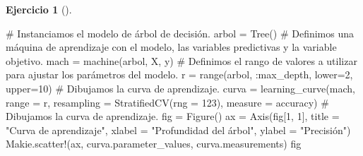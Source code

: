 \documentclass[
  a4paper,
]{scrreport}
\newenvironment{Shaded}{\begin{snugshade}}{\end{snugshade}}
\newcommand{\CommentTok}[1]{\textcolor[rgb]{0.37,0.37,0.37}{#1}}
\newcommand{\FloatTok}[1]{\textcolor[rgb]{0.68,0.00,0.00}{#1}}
\newcommand{\FunctionTok}[1]{\textcolor[rgb]{0.28,0.35,0.67}{#1}}
\newcommand{\NormalTok}[1]{\textcolor[rgb]{0.00,0.23,0.31}{#1}}
\newcommand{\OperatorTok}[1]{\textcolor[rgb]{0.37,0.37,0.37}{#1}}
\newcommand{\StringTok}[1]{\textcolor[rgb]{0.13,0.47,0.30}{#1}}
\theoremstyle{definition}
\newtheorem{exercise}{Ejercicio}[chapter]
\theoremstyle{remark}
\begin{document}
\begin{exercise}[]
\begin{enumerate}
  \begin{tcolorbox}[enhanced jigsaw, toptitle=1mm, breakable, toprule=.15mm, opacitybacktitle=0.6, coltitle=black, titlerule=0mm, arc=.35mm, title=\textcolor{quarto-callout-tip-color}{\faLightbulb}\hspace{0.5em}{Solución}, rightrule=.15mm, opacityback=0, colback=white, bottomrule=.15mm, leftrule=.75mm, colbacktitle=quarto-callout-tip-color!10!white, bottomtitle=1mm, colframe=quarto-callout-tip-color-frame, left=2mm]

\begin{Shaded}
\begin{Highlighting}[]
\CommentTok{\# Instanciamos el modelo de árbol de decisión.}
\NormalTok{arbol }\OperatorTok{=} \FunctionTok{Tree}\NormalTok{()}
\CommentTok{\# Definimos una máquina de aprendizaje con el modelo, las variables predictivas y la variable objetivo.}
\NormalTok{mach }\OperatorTok{=} \FunctionTok{machine}\NormalTok{(arbol, X, y)}
\CommentTok{\# Definimos el rango de valores a utilizar para ajustar los parámetros del modelo.}
\NormalTok{r }\OperatorTok{=} \FunctionTok{range}\NormalTok{(arbol, }\OperatorTok{:}\NormalTok{max\_depth, lower}\OperatorTok{=}\FloatTok{2}\NormalTok{, upper}\OperatorTok{=}\FloatTok{10}\NormalTok{)}
\CommentTok{\# Dibujamos la curva de aprendizaje.}
\NormalTok{curva }\OperatorTok{=} \FunctionTok{learning\_curve}\NormalTok{(mach, range }\OperatorTok{=}\NormalTok{ r, resampling }\OperatorTok{=} \FunctionTok{StratifiedCV}\NormalTok{(rng }\OperatorTok{=} \FloatTok{123}\NormalTok{), measure }\OperatorTok{=}\NormalTok{ accuracy)}
\CommentTok{\# Dibujamos la curva de aprendizaje.}
\NormalTok{fig }\OperatorTok{=} \FunctionTok{Figure}\NormalTok{()}
\NormalTok{ax }\OperatorTok{=} \FunctionTok{Axis}\NormalTok{(fig[}\FloatTok{1}\NormalTok{, }\FloatTok{1}\NormalTok{], title }\OperatorTok{=} \StringTok{"Curva de aprendizaje"}\NormalTok{, xlabel }\OperatorTok{=} \StringTok{"Profundidad del árbol"}\NormalTok{, ylabel }\OperatorTok{=} \StringTok{"Precisión"}\NormalTok{)}
\NormalTok{Makie.}\FunctionTok{scatter!}\NormalTok{(ax, curva.parameter\_values, curva.measurements)}
\NormalTok{fig}
\end{Highlighting}
\end{Shaded}


\end{tcolorbox}
\end{enumerate}
\end{exercise}
\end{document}
